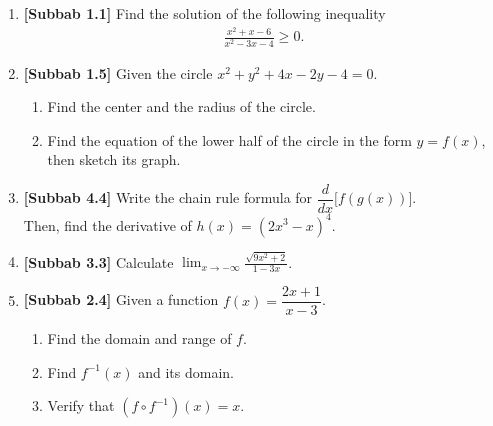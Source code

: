 \documentclass[10pt,openany,a4paper]{article}
\theoremstyle{definition}
\theoremstyle{definition}
\theoremstyle{plain}
\begin{document}
\begin{enumerate}
    \item \textbf{[Subbab 1.1]} Find the solution of the following inequality
    \begin{align*}
        \frac{x^2+x-6}{x^2-3x-4}\geq 0.
    \end{align*}

    \item \textbf{[Subbab 1.5]} Given the circle $x^2+y^2+4x-2y-4=0$.
    \begin{enumerate}
        \item Find the center and the radius of the circle.
        \item Find the equation of the lower half of the circle in the form $y=f(x)$, then sketch its graph.
    \end{enumerate}

    \item \textbf{[Subbab 4.4]} Write the chain rule formula for $\dfrac{d}{dx}\big[f(g(x))\big]$.\\
    Then, find the derivative of $h(x)=\left(2x^3-x\right)^4$.

    \item \textbf{[Subbab 3.3]} Calculate $\displaystyle\lim_{x\to-\infty}\frac{\sqrt{9x^2+2}}{1-3x}$.

    \item \textbf{[Subbab 2.4]} Given a function $f(x)=\dfrac{2x+1}{x-3}$.
    \begin{enumerate}
        \item Find the domain and range of $f$.
        \item Find $f^{-1}(x)$ and its domain.
        \item Verify that $\left(f\circ f^{-1}\right)(x)=x$.
    \end{enumerate}
\end{enumerate}

\newpage
\end{document}
